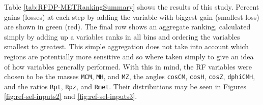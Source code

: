Table \ref{tab:RFDP-METRankingSummary} shows the results of this study.  Percent gains (losses) at each step by adding the variable with biggest gain (smallest loss) are shown in green (red).  The final row shows an aggregate ranking, calculated simply by adding up a variables ranks in all bins and ordering the variables smallest to greatest.  This simple aggregation does not take into account which regions are potentially more sensitive and so where taken simply to give an idea of how variables generally performed.  With this in mind, the RF variables were chosen to be the masses \texttt{MCM}, \texttt{MH}, and \texttt{MZ}, the angles \texttt{cosCM}, \texttt{cosH}, \texttt{cosZ}, \texttt{dphiCMH}, and the ratios \texttt{Rpt}, \texttt{Rpz}, and \texttt{Rmet}.  Their distributions may be seen in Figures \ref{fig:ref-sel-inputs2} and \ref{fig:ref-sel-inputs3}.

